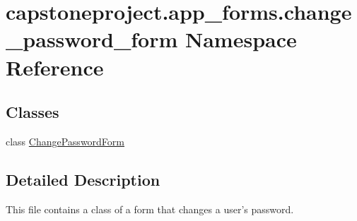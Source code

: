 \hypertarget{namespacecapstoneproject_1_1app__forms_1_1change__password__form}{}\section{capstoneproject.\+app\+\_\+forms.\+change\+\_\+password\+\_\+form Namespace Reference}
\label{namespacecapstoneproject_1_1app__forms_1_1change__password__form}
\subsection*{Classes}
\begin{DoxyCompactItemize}
\item 
class \mbox{\hyperlink{classcapstoneproject_1_1app__forms_1_1change__password__form_1_1_change_password_form}{Change\+Password\+Form}}
\end{DoxyCompactItemize}


\subsection{Detailed Description}
\begin{DoxyVerb}This file contains a class of a form that changes a user's password.
\end{DoxyVerb}
 